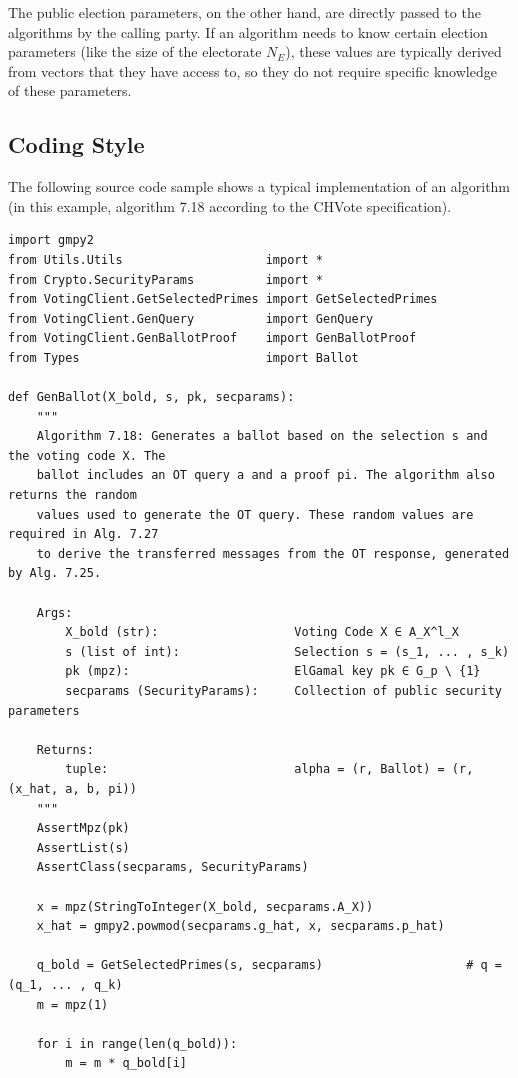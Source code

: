 The public election parameters, on the other hand, are directly passed to the algorithms by the calling party. If an algorithm needs to know certain election parameters (like the size of the electorate $N_E$), these values are typically derived from vectors that they have access to, so they do not require specific knowledge of these parameters.

\subsection{Coding Style}
The following source code sample shows a typical implementation of an algorithm (in this example, algorithm 7.18 according to the CHVote specification).

\begin{verbatim}
import gmpy2
from Utils.Utils                    import *
from Crypto.SecurityParams          import *
from VotingClient.GetSelectedPrimes import GetSelectedPrimes
from VotingClient.GenQuery          import GenQuery
from VotingClient.GenBallotProof    import GenBallotProof
from Types                          import Ballot

def GenBallot(X_bold, s, pk, secparams):
    """
    Algorithm 7.18: Generates a ballot based on the selection s and the voting code X. The
    ballot includes an OT query a and a proof pi. The algorithm also returns the random
    values used to generate the OT query. These random values are required in Alg. 7.27
    to derive the transferred messages from the OT response, generated by Alg. 7.25.

    Args:
        X_bold (str):                   Voting Code X ∈ A_X^l_X
        s (list of int):                Selection s = (s_1, ... , s_k)
        pk (mpz):                       ElGamal key pk ∈ G_p \ {1}
        secparams (SecurityParams):     Collection of public security parameters

    Returns:
        tuple:                          alpha = (r, Ballot) = (r, (x_hat, a, b, pi))
    """
    AssertMpz(pk)
    AssertList(s)
    AssertClass(secparams, SecurityParams)

    x = mpz(StringToInteger(X_bold, secparams.A_X))
    x_hat = gmpy2.powmod(secparams.g_hat, x, secparams.p_hat)

    q_bold = GetSelectedPrimes(s, secparams)                    # q = (q_1, ... , q_k)
    m = mpz(1)

    for i in range(len(q_bold)):
        m = m * q_bold[i]


\end{verbatim}
